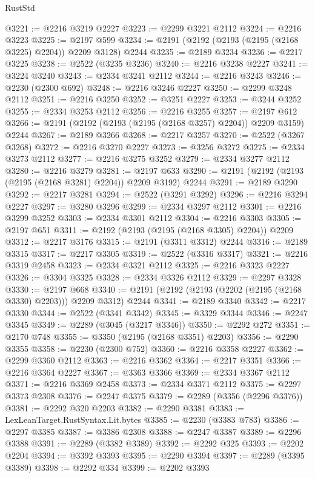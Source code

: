 \begin{lexlean}{RustStd}
\begin{coremodule}
@3221 := @2216 @3219 @2227
@3223 := @2299 @3221 @2112
@3224 := @2216 @3223
@3225 := @2197 @599
@3234 := @2191 (@2192 (@2193 (@2195 (@2168 @3225) @2204)) @2209 @3128) @2244
@3235 := @2189 @3234
@3236 := @2217 @3225
@3238 := @2522 (@3235 @3236)
@3240 := @2216 @3238 @2227
@3241 := @3224 @3240
@3243 := @2334 @3241 @2112
@3244 := @2216 @3243
@3246 := @2230 (@2300 @692)
@3248 := @2216 @3246 @2227
@3250 := @2299 @3248 @2112
@3251 := @2216 @3250
@3252 := @3251 @2227
@3253 := @3244 @3252
@3255 := @2334 @3253 @2112
@3256 := @2216 @3255
@3257 := @2197 @612
@3266 := @2191 (@2192 (@2193 (@2195 (@2168 @3257) @2204)) @2209 @3159) @2244
@3267 := @2189 @3266
@3268 := @2217 @3257
@3270 := @2522 (@3267 @3268)
@3272 := @2216 @3270 @2227
@3273 := @3256 @3272
@3275 := @2334 @3273 @2112
@3277 := @2216 @3275 @3252
@3279 := @2334 @3277 @2112
@3280 := @2216 @3279
@3281 := @2197 @633
@3290 := @2191 (@2192 (@2193 (@2195 (@2168 @3281) @2204)) @2209 @3192) @2244
@3291 := @2189 @3290
@3292 := @2217 @3281
@3294 := @2522 (@3291 @3292)
@3296 := @2216 @3294 @2227
@3297 := @3280 @3296
@3299 := @2334 @3297 @2112
@3301 := @2216 @3299 @3252
@3303 := @2334 @3301 @2112
@3304 := @2216 @3303
@3305 := @2197 @651
@3311 := @2192 (@2193 (@2195 (@2168 @3305) @2204)) @2209
@3312 := @2217 @3176
@3315 := @2191 (@3311 @3312) @2244
@3316 := @2189 @3315
@3317 := @2217 @3305
@3319 := @2522 (@3316 @3317)
@3321 := @2216 @3319 @2458
@3323 := @2334 @3321 @2112
@3325 := @2216 @3323 @2227
@3326 := @3304 @3325
@3328 := @2334 @3326 @2112
@3329 := @2297 @3328
@3330 := @2197 @668
@3340 := @2191 (@2192 (@2193 (@2202 (@2195 (@2168 @3330) @2203))) @2209 @3312) @2244
@3341 := @2189 @3340
@3342 := @2217 @3330
@3344 := @2522 (@3341 @3342)
@3345 := @3329 @3344
@3346 := @2247 @3345
@3349 := @2289 (@3045 (@3217 @3346))
@3350 := @2292 @272
@3351 := @2170 @748
@3355 := @3350 (@2195 (@2168 @3351) @2203)
@3356 := @2290 @3355
@3358 := @2230 (@2300 @752)
@3360 := @2216 @3358 @2227
@3362 := @2299 @3360 @2112
@3363 := @2216 @3362
@3364 := @2217 @3351
@3366 := @2216 @3364 @2227
@3367 := @3363 @3366
@3369 := @2334 @3367 @2112
@3371 := @2216 @3369 @2458
@3373 := @2334 @3371 @2112
@3375 := @2297 @3373 @2308
@3376 := @2247 @3375
@3379 := @2289 (@3356 (@2296 @3376))
@3381 := @2292 @320 @2203
@3382 := @2290 @3381
@3383 := LexLeanTarget.RustSyntax.Lit.bytes
@3385 := @2230 (@3383 @783)
@3386 := @2297 @3385
@3387 := @3386 @2308
@3388 := @2247 @3387
@3389 := @2296 @3388
@3391 := @2289 (@3382 @3389)
@3392 := @2292 @325
@3393 := @2202 @2204
@3394 := @3392 @3393
@3395 := @2290 @3394
@3397 := @2289 (@3395 @3389)
@3398 := @2292 @334
@3399 := @2202 @3393

\end{coremodule}
\end{lexlean}
